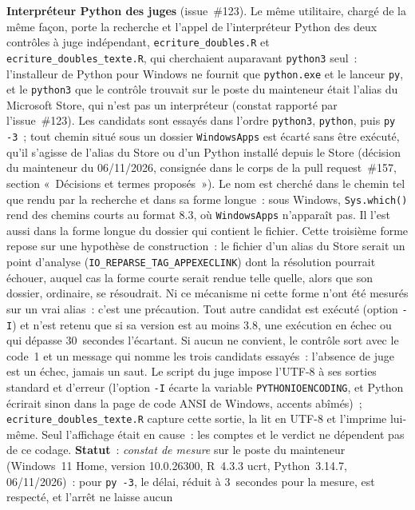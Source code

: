 \documentclass[a4paper,11pt]{article}
\newcommand{\code}[1]{\texttt{\small #1}}
\begin{document}
\textbf{Interpréteur Python des juges} (issue~\#123). Le même utilitaire,
chargé de la même façon, porte la recherche et l'appel de l'interpréteur
Python des deux contrôles à juge indépendant, \code{ecriture\_doubles.R}
et \code{ecriture\_doubles\_texte.R}, qui cherchaient auparavant
\code{python3} seul~: l'installeur de Python pour Windows ne fournit que
\code{python.exe} et le lanceur \code{py}, et le \code{python3} que le
contrôle trouvait sur le poste du mainteneur était l'alias du Microsoft
Store, qui n'est pas un interpréteur (constat rapporté par
l'issue~\#123). Les candidats sont essayés dans l'ordre \code{python3},
\code{python}, puis \code{py -3}~; tout chemin situé sous un dossier
\code{WindowsApps} est écarté sans être exécuté, qu'il s'agisse de l'alias
du Store ou d'un Python installé depuis le Store (décision du mainteneur du
06/11/2026, consignée dans le corps de la pull request~\#157, section
«~Décisions et termes proposés~»). Le nom est cherché dans le chemin tel
que rendu par la recherche et dans sa forme longue~: sous Windows,
\code{Sys.which()} rend des chemins courts au format 8.3, où
\code{WindowsApps} n'apparaît pas. Il l'est aussi dans la forme longue
du dossier qui contient le fichier. Cette troisième forme repose sur une
hypothèse de construction~: le fichier d'un alias du Store serait un
point d'analyse (\code{IO\_REPARSE\_TAG\_APPEXECLINK}) dont la
résolution pourrait échouer, auquel cas la forme courte serait rendue
telle quelle, alors que son dossier, ordinaire, se résoudrait. Ni ce
mécanisme ni cette forme n'ont été mesurés sur un vrai alias~: c'est une
précaution. Tout
autre candidat est exécuté (option \code{-I}) et n'est retenu que si sa
version est au moins 3.8, une exécution en échec ou qui dépasse
30~secondes l'écartant. Si aucun ne convient, le contrôle sort avec le
code~1 et un message qui nomme les trois candidats essayés~: l'absence de
juge est un échec, jamais un saut. Le script du juge impose l'UTF-8 à ses
sorties standard et d'erreur (l'option \code{-I} écarte la variable
\code{PYTHONIOENCODING}, et Python écrirait sinon dans la page de code
ANSI de Windows, accents abîmés)~; \code{ecriture\_doubles\_texte.R}
capture cette sortie, la lit en UTF-8 et l'imprime lui-même. Seul
l'affichage était en cause~: les comptes et le verdict ne dépendent pas de
ce codage. \textbf{Statut}~: \emph{constat de mesure} sur le poste du
mainteneur (Windows~11 Home, version 10.0.26300, R~4.3.3 ucrt,
Python~3.14.7, 06/11/2026)~: pour \code{py -3}, le délai, réduit à
3~secondes pour la mesure, est respecté, et l'arrêt ne laisse aucun
\end{document}
